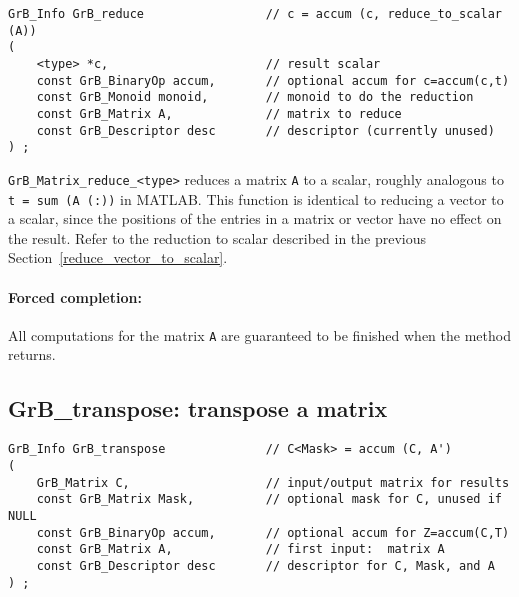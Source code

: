 \documentclass[12pt]{article}
\begin{document}
\begin{mdframed}[userdefinedwidth=6in]
{\footnotesize
\begin{verbatim}
GrB_Info GrB_reduce                 // c = accum (c, reduce_to_scalar (A))
(
    <type> *c,                      // result scalar
    const GrB_BinaryOp accum,       // optional accum for c=accum(c,t)
    const GrB_Monoid monoid,        // monoid to do the reduction
    const GrB_Matrix A,             // matrix to reduce
    const GrB_Descriptor desc       // descriptor (currently unused)
) ;
\end{verbatim} } \end{mdframed}

\verb'GrB_Matrix_reduce_<type>' reduces a matrix \verb'A' to a scalar, roughly
analogous to \verb't = sum (A (:))' in MATLAB.  This function is identical to
reducing a vector to a scalar, since the positions of the entries in a matrix
or vector have no effect on the result.  Refer to the reduction to scalar
described in the previous Section~\ref{reduce_vector_to_scalar}.

\paragraph{Forced completion:}
All computations for the matrix \verb'A' are
guaranteed to be finished when the method returns.

\newpage
\subsection{{\sf GrB\_transpose:} transpose a matrix} %
\label{transpose}

\begin{mdframed}[userdefinedwidth=6in]
{\footnotesize
\begin{verbatim}
GrB_Info GrB_transpose              // C<Mask> = accum (C, A')
(
    GrB_Matrix C,                   // input/output matrix for results
    const GrB_Matrix Mask,          // optional mask for C, unused if NULL
    const GrB_BinaryOp accum,       // optional accum for Z=accum(C,T)
    const GrB_Matrix A,             // first input:  matrix A
    const GrB_Descriptor desc       // descriptor for C, Mask, and A
) ;
\end{verbatim} } \end{mdframed}
\end{document}
